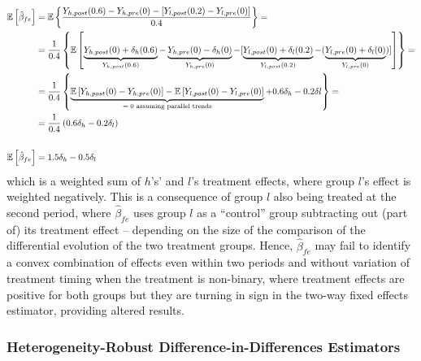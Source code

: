\documentclass[11pt]{article}
\begin{document}
\begin{equation*}
    \begin{split}
    \mathbb{E} \left[ \hat{\beta}_{fe} \right] &= \mathbb{E} \left\{ \frac{Y_{h,post}(0.6) - Y_{h,pre}(0) - \left[ Y_{l,post}(0.2) - Y_{l,pre}(0) \right]}{0.4} \right\} =  \\
                                       &= \frac{1}{0.4} \left\{  \mathbb{E} \left[ \underbrace{Y_{h,post}(0) + \delta_{h}(0.6)}_{Y_{h,post}(0.6)} - \underbrace{Y_{h,pre}(0) - \delta_{h}(0)}_{Y_{h,pre}(0)} - [ \underbrace{Y_{l,post}(0) + \delta_{l}(0.2)}_{Y_{l,post}(0.2)} - ( \underbrace{Y_{l,pre}(0) + \delta_{l}(0)}_{Y_{l,pre}(0)} ) ]  \right] \right\} = \\
                                       &= \frac{1}{0.4} \left\{  \underbrace{\mathbb{E} \left[ Y_{h,post}(0) - Y_{h,pre}(0) \right] - \mathbb{E} \left[ Y_{l,post}(0) - Y_{l,pre}(0) \right]}_{\text{$=0$ assuming parallel trends}} + 0.6\delta_{h} - 0.2\delta{l} \right\} = \\
                                       &= \frac{1}{0.4} \left( 0.6 \delta_{h} - 0.2 \delta_{l} \right) \\
                                       & \\
    \mathbb{E} \left[ \hat{\beta}_{fe} \right] &= 1.5 \delta_{h} - 0.5 \delta_{l}
    \end{split}
\end{equation*}
which is a weighted sum of $h$'s' and $l$'s treatment effects, where group $l$'s effect is weighted negatively. This is a consequence of group $l$ also being treated at the second period, where $\hat{\beta}_{fe}$ uses group $l$ as a ``control'' group subtracting out (part of) its treatment effect -- depending on the size of the comparison of the differential evolution of the two treatment groups. Hence, $\hat{\beta}_{fe}$ may fail to identify a convex combination of effects even within two periods and without variation of treatment timing when the treatment is non-binary, where treatment effects are positive for both groups but they are turning in sign in the two-way fixed effects estimator, providing altered results.


\subsubsection{Heterogeneity-Robust Difference-in-Differences Estimators}\label{sec:hrdidestimators}
\end{document}
